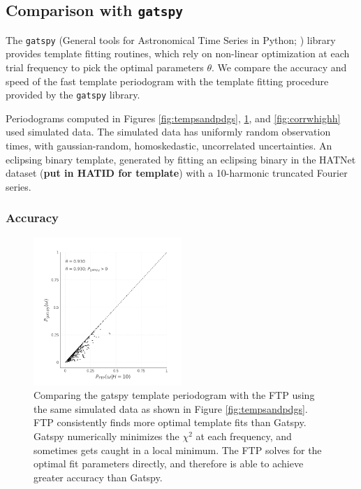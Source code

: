 \documentclass[apj]{emulateapj}
\newcommand{\todo}[1]{{\bf #1}}
\begin{document}
\subsection{Comparison with \texttt{gatspy}}

The \texttt{gatspy} (General tools for Astronomical Time Series in Python; 
\cite{gatspy,Vanderplas+Ivezic_2015}) library provides template fitting
routines, which rely on non-linear optimization at each trial frequency
to pick the optimal parameters $\theta$. We compare the accuracy and
speed of the fast template periodogram with the template fitting
procedure provided by the \texttt{gatspy} library.

Periodograms computed in Figures \ref{fig:tempsandpdgs}, \ref{fig:corrwgats},
and \ref{fig:corrwhighh} used simulated data. The simulated data has uniformly
random observation times, with gaussian-random, homoskedastic, uncorrelated 
uncertainties. An eclipsing binary template, generated by fitting an
eclipsing binary in the HATNet dataset (\todo{put in HATID for template})
with a 10-harmonic truncated Fourier series.

\subsubsection{Accuracy}

\begin{figure}
    \centering
    \includegraphics[width=0.5\textwidth]{plots/correlation_with_gatspy.pdf}
    \caption{\label{fig:corrwgats} Comparing the gatspy template periodogram with 
            the FTP using the same simulated data as shown in Figure \ref{fig:tempsandpdgs}.
            FTP consistently finds more optimal template fits than Gatspy. Gatspy numerically 
            minimizes the $\chi^2$ at each frequency,
            and sometimes gets caught in a local minimum. The FTP solves for the optimal
            fit parameters directly, and therefore is able to achieve greater accuracy than Gatspy.}
\end{figure}
\end{document}
